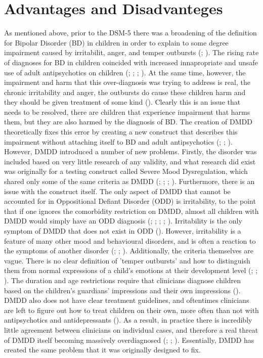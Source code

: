 \documentclass[stu,a4paper,12pt,donotrepeattitle]{apa7}
\begin{document}
\section{Advantages and Disadvanteges}
As mentioned above, prior to the DSM-5 there was a broadening of the definition
for Bipolar Disorder (BD) in children in order to explain to some degree impairment
caused by irritabilit, anger, and temper outbursts (\cite{baweja16};
\cite{mahbell19}). The rising rate of diagnoses for BD in children coincided with
increased innapropriate and unsafe use of adult antipsychotics on children
(\cite{baweja16}; \cite{franc13}; \cite{lochman15}; \cite{mahbell19}). At the
same time, however, the impairment and harm that this over-diagnosis was trying
to address is real, the chronic irritability and anger, the outbursts do cause
these children harm and they should be given treatment of some kind
(\cite{baweja16}). Clearly this is an issue that needs to be resolved, there are
children that experience impairment that harms them, but they are also harmed by
the diagnosis of BD. The creation of DMDD theoretically fixes this error by
creating a new construct that describes this impairment without attaching
itself to BD and adult antipsychotics (\cite{baweja16}; \cite{franc13};
\cite{mahbell19}).\\
However, DMDD introduced a number of new problems. Firstly, the disorder was
included based on very little research of any validity, and what research did
exist was originally for a testing construct called Severe Mood Dysregulation,
which shared only some of the same criteria as DMDD (\cite{baweja16};
\cite{franc13}; \cite{lochman15}; \cite{mahbell19}). Furthermore, there is an
issue with the construct itself. The only aspect of DMDD that cannot be accounted
for in Oppositional Defiant Disorder (ODD) is irritability, to the point that if
one ignores the comorbidity restriction on DMDD, almost all children with DMDD
would simply have an ODD diagnosis (\cite{baweja16}; \cite{lochman15};
\cite{mahbell19}; \cite{mayetal16}; \cite{mayetal19}). Irritability is the only
symptom of DMDD that does not exist in ODD (\cite{apa13}). However, irritability
is a feature of many other mood and behavioural disorders, and is often a reaction
to the symptoms of another disorder (\cite{mahbell19}; \cite{mayetal16};
\cite{mayetal19}). Additionally, the criteria themselves are vague. There is no
clear definition of 'temper outbursts' and how to distinguish them from normal
expressions of a child's emotions at their development level (\cite{baweja16};
\cite{franc13}; \cite{mahbell19}). The duration and age restrictions require
that clinicians diagnose children based on the children's guardians' impressions
and their own impressions (\cite{mahbell19}). DMDD also does not have clear
treatment guidelines, and oftentimes clinicians are left to figure out how to
treat children on their own, more often than not with antipsychotics and
antidepressants (\cite{mahbell19}).
As a result, in practice there is incredibly little agreement between clinicians
on individual cases, and therefore a real threat of DMDD itself becoming massively
overdiagnosed (\cite{franc13}; \cite{lochman15}; \cite{mahbell19}). Essentially,
DMDD has created the same problem that it was originally  designed to fix.
\end{document}
